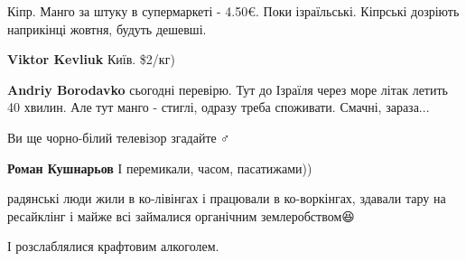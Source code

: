 Кіпр. Манго за штуку в супермаркеті - 4.50€. Поки ізраїльські. Кіпрські дозріють наприкінці жовтня, будуть дешевші.

 
\textbf{Viktor Kevliuk}
Київ.
\$2/кг)

 
\textbf{Andriy Borodavko} сьогодні перевірю. Тут до Ізраїля через море літак летить 40 хвилин. Але тут манго - стиглі, одразу треба споживати. Смачні, зараза...

 
Ви ще чорно-білий телевізор згадайте🤦♂️

 
\textbf{Роман Кушнарьов}
І перемикали, часом, пасатижами))

 
радянські люди жили в ко-лівінгах і працювали в ко-воркінгах, здавали тару на ресайклінг і майже всі займалися органічним землеробством😆

 
І розслаблялися крафтовим алкоголем.

